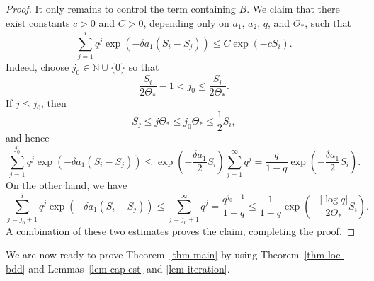 \documentclass[11pt]{amsart}
\theoremstyle{plain}
\theoremstyle{definition}
\numberwithin{equation}{section}
\begin{document}
\begin{proof}
    It only remains to control the term containing $B$. We claim that there exist constants $c>0$ and $C>0$, depending only on $a_1$, $a_2$, $q$, and $\Theta_\ast$, such that
    \begin{equation*}
        \sum_{j=1}^i q^j \exp\left(-\delta a_1 (S_i-S_j)\right) \leq C \exp \left(-c S_i \right).
    \end{equation*}
    Indeed, choose $j_0 \in \mathbb N \cup \{0\}$ so that 
    \begin{equation*}
       \frac{S_i}{2\Theta_{\ast}}-1 < j_0 \leq \frac{S_i}{2\Theta_{\ast}}.
    \end{equation*}
    If $j \leq j_0$, then 
    \begin{equation*}
       S_j \leq j \Theta_{\ast} \leq  j_0 \Theta_{\ast} \leq \frac{1}{2}S_i,
    \end{equation*}
    and hence
    \begin{equation*}
        \sum_{j=1}^{j_0} q^j \exp\left(-\delta a_1 (S_i-S_j)\right) \leq \exp\left(-\frac{\delta a_1}{2} S_i\right) \sum_{j=1}^{\infty}q^j=\frac{q}{1-q}\exp\left(-\frac{\delta a_1}{2}S_i\right).
    \end{equation*}
    On the other hand, we have
    \begin{equation*}
        \sum_{j=j_0+1}^i q^j \exp\left(-\delta a_1 (S_i-S_j)\right) \leq \sum_{j=j_0+1}^{\infty} q^j = \frac{q^{j_0+1}}{1-q} \leq \frac{1}{1-q} \exp\left(-\frac{|\log q|}{2\Theta_{\ast}}S_i \right).
    \end{equation*}
    A combination of these two estimates proves the claim, completing the proof.
\end{proof}





We are now ready to prove Theorem~\ref{thm-main} by using Theorem~\ref{thm-loc-bdd} and Lemmas~\ref{lem-cap-est} and \ref{lem-iteration}.
\end{document}
